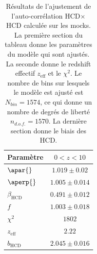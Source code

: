 \begin{table}[h]
  \centering
  \caption{Résultats de l'ajustement de l'auto-corrélation HCD$\times$HCD calculée sur les mocks. La première section du tableau donne les paramètres du modèle qui sont ajustés. La seconde donne le redshift effectif $z_{\mathrm{eff}}$ et le $\chi^2$. Le nombre de bins sur lesquels le modèle est ajusté est $N_{bin} = \num{1574}$, ce qui donne un nombre de degrés de liberté $n_{d.o.f.} = \num{1570}$. La dernière section donne le biais des HCD.}
  \label{tab:auto_hcd}
  \begin{tabular}{lc}
    \toprule
    Param\`etre  & $\num{0} < z < \num{10}$ \\
    \midrule
    $\apar{} $ & $ 1.019 \pm 0.02$ \\
    $\aperp{} $ & $ 1.005 \pm 0.014$ \\
    $\beta_{\mathrm{HCD}} $ & $ 0.491 \pm 0.012$ \\
    $f$ & $ 1.003 \pm 0.018$ \\
    \midrule
    $\chi^2$ & $ 1802 $ \\
    $z_{\mathrm{eff}}$ & $ 2.22 $ \\
    \midrule
    $b_{\mathrm{HCD}} $ & $ 2.045 \pm 0.016$ \\
\bottomrule
  \end{tabular}
\end{table}

\newpage
